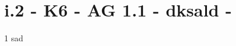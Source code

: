 \section{i.2 - K6 - AG 1.1 - dksald  - }

\begin{langesbeispiel} \item[1] %
sad
\end{langesbeispiel}